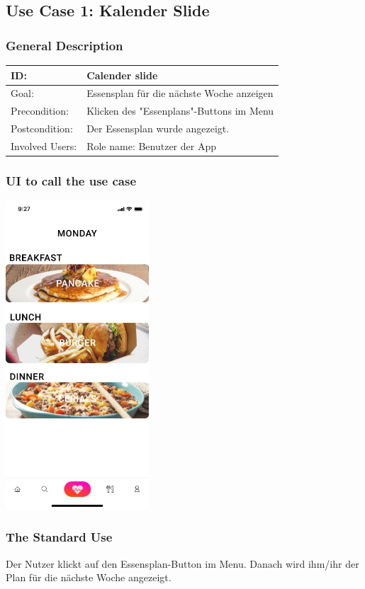 \documentclass[12pt]{article}
\theoremstyle{definition}
\begin{document}
\subsection{Use Case 1: Kalender Slide}
\subsubsection{General Description}
\begin{tabular}{|p{.2\linewidth}|p{.65\linewidth}|}
\hline 
ID: & Calender slide \\ \hline
Goal: & Essensplan für die nächste Woche anzeigen \\ \hline
Precondition: & Klicken des "Essenplans"-Buttons im Menu\\ \hline
Postcondition: & Der Essensplan wurde angezeigt. \\ \hline
Involved Users: &Role name: Benutzer der App \\ \hline
\end{tabular}

\subsubsection{UI to call the use case}


\begin{center}
    \includegraphics[width=0.4\textwidth]{res/images/Calendar.jpeg}
\end{center}


\subsubsection{The Standard Use}
Der Nutzer klickt auf den Essensplan-Button im Menu. Danach wird ihm/ihr der Plan für die nächste Woche angezeigt.
\end{document}
